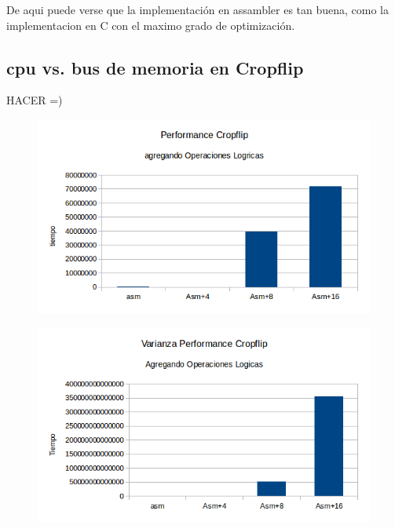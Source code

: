 \documentclass[a4paper]{article}
\begin{document}
De aqui puede verse que la implementación en assambler es tan buena, como la implementacion en C con el maximo grado de optimización.

\newpage

\subsection{cpu vs. bus de memoria en Cropflip}
HACER =)

\begin{figure}[h!]
  \begin{center}
  \includegraphics[scale=0.66]{Graficos1.5/crop/addsub/per.png}
  \label{nombreparareferenciar1}
  \end{center}
\end{figure}

\begin{figure}[h!]
  \begin{center}
  \includegraphics[scale=0.66]{Graficos1.5/crop/addsub/var.png}
  \label{nombreparareferenciar1}
  \end{center}
\end{figure}
\end{document}
